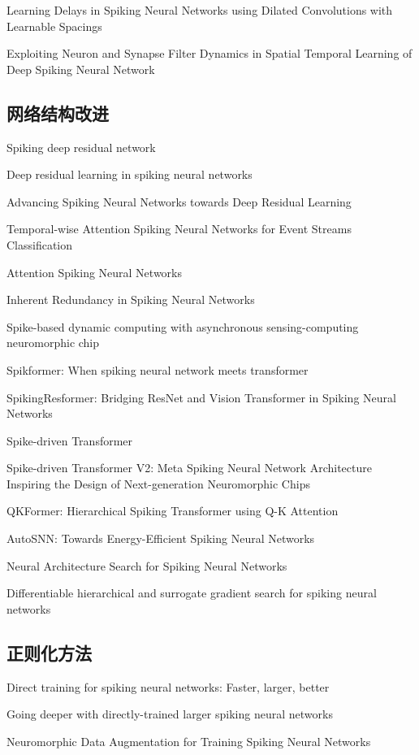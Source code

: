 \documentclass{SCIS2020cn}
\begin{document}
Learning Delays in Spiking Neural Networks using Dilated Convolutions with Learnable Spacings

Exploiting Neuron and Synapse Filter Dynamics in Spatial Temporal Learning of Deep Spiking Neural Network


\subsection{网络结构改进}%

Spiking deep residual network

Deep residual learning in spiking neural networks

Advancing Spiking Neural Networks towards Deep Residual Learning

Temporal-wise Attention Spiking Neural Networks for Event Streams Classification

Attention Spiking Neural Networks

Inherent Redundancy in Spiking Neural Networks

Spike-based dynamic computing with asynchronous sensing-computing neuromorphic chip

Spikformer: When spiking neural network meets transformer

SpikingResformer: Bridging ResNet and Vision Transformer in Spiking Neural Networks

Spike-driven Transformer

Spike-driven Transformer V2: Meta Spiking Neural Network Architecture Inspiring the Design of Next-generation Neuromorphic Chips

QKFormer: Hierarchical Spiking Transformer using Q-K Attention

AutoSNN: Towards Energy-Efficient Spiking Neural Networks

Neural Architecture Search for Spiking Neural Networks

Differentiable hierarchical and surrogate gradient
search for spiking neural networks

\subsection{正则化方法}%

Direct training for spiking neural networks: Faster, larger, better

Going deeper with directly-trained larger spiking neural networks

Neuromorphic Data Augmentation for Training Spiking Neural Networks
\end{document}
